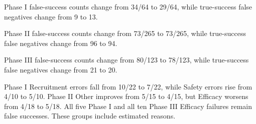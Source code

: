 Phase I false-success counts change from 34/64 to 29/64, while true-success false negatives change from 9 to 13.

Phase II false-success counts change from 73/265 to 73/265, while true-success false negatives change from 96 to 94.

Phase III false-success counts change from 80/123 to 78/123, while true-success false negatives change from 21 to 20.

Phase I Recruitment errors fall from 10/22 to 7/22, while Safety errors rise from 4/10 to 5/10. Phase II Other improves from 5/15 to 4/15, but Efficacy worsens from 4/18 to 5/18. All five Phase I and all ten Phase III Efficacy failures remain false successes. These groups include estimated reasons.
